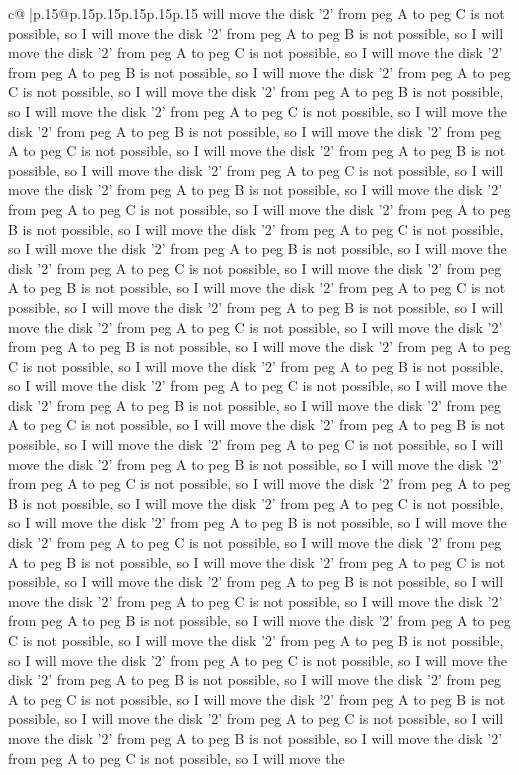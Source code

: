 \documentclass{article}
\begin{document}
{\begin{supertabular}{c@{$\;$}|p{.15\linewidth}@{}p{.15\linewidth}p{.15\linewidth}p{.15\linewidth}p{.15\linewidth}p{.15\linewidth}}
{{{will move the disk '2' from peg A to peg C is not possible, so I will move the disk '2' from peg A to peg B is not possible, so I will move the disk '2' from peg A to peg C is not possible, so I will move the disk '2' from peg A to peg B is not possible, so I will move the disk '2' from peg A to peg C is not possible, so I will move the disk '2' from peg A to peg B is not possible, so I will move the disk '2' from peg A to peg C is not possible, so I will move the disk '2' from peg A to peg B is not possible, so I will move the disk '2' from peg A to peg C is not possible, so I will move the disk '2' from peg A to peg B is not possible, so I will move the disk '2' from peg A to peg C is not possible, so I will move the disk '2' from peg A to peg B is not possible, so I will move the disk '2' from peg A to peg C is not possible, so I will move the disk '2' from peg A to peg B is not possible, so I will move the disk '2' from peg A to peg C is not possible, so I will move the disk '2' from peg A to peg B is not possible, so I will move the disk '2' from peg A to peg C is not possible, so I will move the disk '2' from peg A to peg B is not possible, so I will move the disk '2' from peg A to peg C is not possible, so I will move the disk '2' from peg A to peg B is not possible, so I will move the disk '2' from peg A to peg C is not possible, so I will move the disk '2' from peg A to peg B is not possible, so I will move the disk '2' from peg A to peg C is not possible, so I will move the disk '2' from peg A to peg B is not possible, so I will move the disk '2' from peg A to peg C is not possible, so I will move the disk '2' from peg A to peg B is not possible, so I will move the disk '2' from peg A to peg C is not possible, so I will move the disk '2' from peg A to peg B is not possible, so I will move the disk '2' from peg A to peg C is not possible, so I will move the disk '2' from peg A to peg B is not possible, so I will move the disk '2' from peg A to peg C is not possible, so I will move the disk '2' from peg A to peg B is not possible, so I will move the disk '2' from peg A to peg C is not possible, so I will move the disk '2' from peg A to peg B is not possible, so I will move the disk '2' from peg A to peg C is not possible, so I will move the disk '2' from peg A to peg B is not possible, so I will move the disk '2' from peg A to peg C is not possible, so I will move the disk '2' from peg A to peg B is not possible, so I will move the disk '2' from peg A to peg C is not possible, so I will move the disk '2' from peg A to peg B is not possible, so I will move the disk '2' from peg A to peg C is not possible, so I will move the disk '2' from peg A to peg B is not possible, so I will move the disk '2' from peg A to peg C is not possible, so I will move the disk '2' from peg A to peg B is not possible, so I will move the disk '2' from peg A to peg C is not possible, so I will move the disk '2' from peg A to peg B is not possible, so I will move the disk '2' from peg A to peg C is not possible, so I will move the disk '2' from peg A to peg B is not possible, so I will move the disk '2' from peg A to peg C is not possible, so I will move the }}}
\end{supertabular}}
\end{document}
